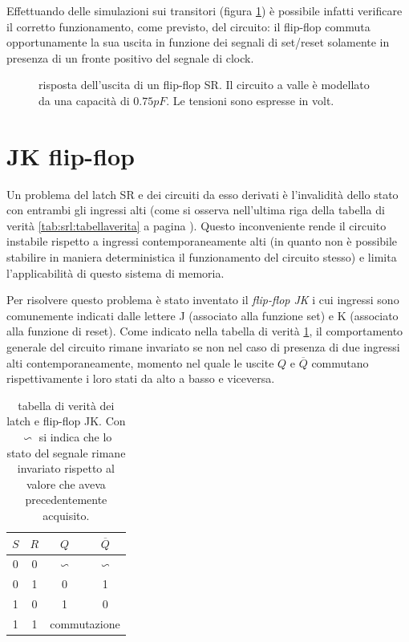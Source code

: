 	Effettuando delle simulazioni sui transitori (figura \ref{fig:srl:flipflop-sim}) è possibile infatti verificare il corretto funzionamento, come previsto, del circuito: il flip-flop commuta opportunamente la sua uscita in funzione dei segnali di set/reset solamente in presenza di un fronte positivo del segnale di clock.
	
	\begin{figure}[bht]
		\centering
		
		\caption{risposta dell'uscita di un flip-flop SR. Il circuito a valle è modellato da una capacità di $0.75pF$. Le tensioni sono espresse in volt.}
		\label{fig:srl:flipflop-sim}
	\end{figure}

\section{JK flip-flop}
	Un problema del latch SR e dei circuiti da esso derivati è l'invalidità dello stato con entrambi gli ingressi alti (come si osserva nell'ultima riga della tabella di verità \ref{tab:srl:tabellaverita} a pagina \pageref{tab:srl:tabellaverita}). Questo inconveniente rende il circuito instabile rispetto a ingressi contemporaneamente alti (in quanto non è possibile stabilire in maniera deterministica il funzionamento del circuito stesso) e limita l'applicabilità di questo sistema di memoria.
	
	Per risolvere questo problema è stato inventato il \textit{flip-flop JK} i cui ingressi sono comunemente indicati dalle lettere J (associato alla funzione set) e K (associato alla funzione di reset). Come indicato nella tabella di verità \ref{tab:jkl:tabellaverita}, il comportamento generale del circuito rimane invariato se non nel caso di presenza di due ingressi alti contemporaneamente, momento nel quale le uscite $Q$ e $\overline Q$ commutano rispettivamente i loro stati da alto a basso e viceversa. 
	
	\begin{table}[bht]
		\centering
		\begin{tabular}{c c | c c }
			$S$ & $R$ & $Q$ & $\overline Q$ \\ \hline
			0 & 0 & $\backsim$ & $\backsim$ \\
			0 & 1 & 0 & 1 \\
			1 & 0 & 1 & 0 \\
			1 & 1 & \multicolumn{2}{c}{commutazione} 		
		\end{tabular}
		\caption{tabella di verità dei latch e flip-flop JK. Con $\backsim$ si indica che lo stato del segnale rimane invariato rispetto al valore che aveva precedentemente acquisito.}
		\label{tab:jkl:tabellaverita}
	\end{table}
	
